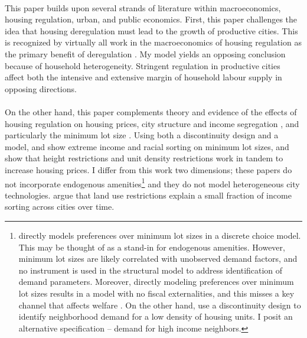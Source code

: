 \documentclass[11pt]{article}
\begin{document}
	\paragraph*{}
	This paper builds upon several strands of literature within  macroeconomics, housing regulation, urban, and public economics. First, this paper challenges the idea that housing deregulation must lead to the growth of productive cities. This is recognized by virtually all work in the macroeconomics of housing regulation as the primary benefit of deregulation \citep{hseihmoretti, durantonpugaurbgrowth, parkho, hop, bunten}. My model yields an opposing conclusion because of household heterogeneity. Stringent regulation in productive cities affect both the intensive and extensive margin of household labour supply in opposing directions. 
	
	\paragraph*{}
	On the other hand, this paper complements theory and evidence of the effects of housing regulation on housing prices, city structure and income segregation \citep{MolloyRSUE, gyourkomolloy, turner2014, glaesergyourko2018, bruecknersingh, anagoletal2021, bbheight, mills2005, HILBER2013, op2014}, and particularly the minimum lot size \citep{zabel, Song, kulka, Cui, molloynathansonpaciorek, KSC, griesonwhite, WHITE1975}. Using both a discontinuity design and a model, \cite{Song} and \cite{kulka} show extreme income and racial sorting on minimum lot sizes, and \cite{KSC} show that height restrictions and unit density restrictions work in tandem to increase housing prices. I differ from this work two dimensions; these papers do not incorporate endogenous amenities\footnote{\cite{Song} directly models preferences over minimum lot sizes in a discrete choice model. This may be thought of as a stand-in for endogenous amenities. However, minimum lot sizes are likely correlated with unobserved demand factors, and no instrument is used in the structural model to address identification of demand parameters. Moreover, directly modeling preferences over minimum lot sizes results in a model with no fiscal externalities, and this misses a key channel that affects welfare \citep{hamilton1976, calabresetal}. On the other hand, \cite{KSC} use a discontinuity design to identify neighborhood demand for a low density of housing units. I posit an alternative specification -- demand for high income neighbors.} and they do not model heterogeneous city technologies. \cite{molloynathansonpaciorek} argue that land use restrictions explain a small fraction of income sorting across cities over time. 
	
\end{document}
